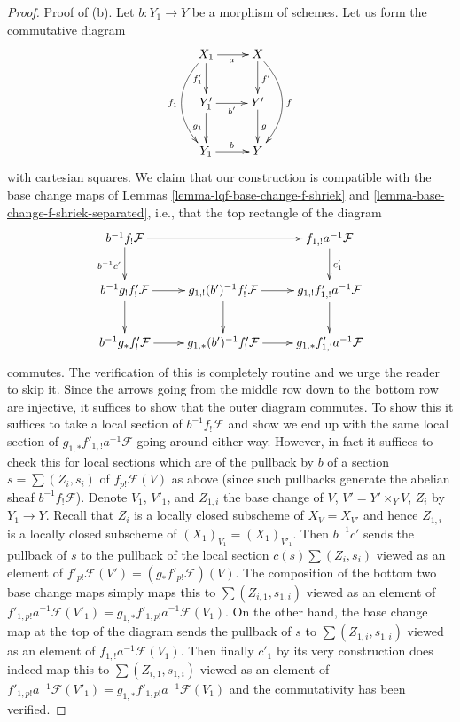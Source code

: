 \documentclass{stacks-project}
\theoremstyle{plain}
\theoremstyle{definition}
\theoremstyle{remark}
\numberwithin{equation}{subsection}
\begin{document}
\begin{proof}
\medskip\noindent
Proof of (b). Let $b : Y_1 \to Y$ be a morphism of schemes. Let us form the
commutative diagram
$$
\xymatrix{
X_1 \ar[d]_{f'_1} \ar[r]_a \ar@/_2em/[dd]_{f_1} &
X \ar[d]^{f'} \ar@/^2em/[dd]^f \\
Y'_1 \ar[d]_{g_1} \ar[r]_{b'} &
Y' \ar[d]^g \\
Y_1 \ar[r]^b &
Y
}
$$
with cartesian squares. We claim that our construction is compatible
with the base change maps of Lemmas \ref{lemma-lqf-base-change-f-shriek}
and \ref{lemma-base-change-f-shriek-separated}, i.e.,
that the top rectangle of the diagram
$$
\xymatrix{
b^{-1}f_!\mathcal{F} \ar[rr] \ar[d]_{b^{-1}c'} & &
f_{1, !}a^{-1}\mathcal{F} \ar[d]^{c_1'} \\
b^{-1}g_!f'_!\mathcal{F} \ar[r] \ar[d] &
g_{1, !}(b')^{-1}f'_!\mathcal{F} \ar[r] \ar[d] &
g_{1, !}f'_{1, !}a^{-1}\mathcal{F} \ar[d] \\
b^{-1}g_*f'_!\mathcal{F} \ar[r] &
g_{1, *}(b')^{-1}f'_!\mathcal{F} \ar[r] &
g_{1, *}f'_{1, !}a^{-1}\mathcal{F}
}
$$
commutes. The verification of this is completely routine and we
urge the reader to skip it. Since the arrows going from the middle
row down to the bottom row are injective, it suffices to show that
the outer diagram commutes.
To show this it suffices to take a local section of
$b^{-1}f_!\mathcal{F}$ and show we end up with the same local
section of $g_{1, *}f'_{1, !}a^{-1}\mathcal{F}$
going around either way. However, in fact it suffices to check
this for local sections which are of the pullback by $b$ of
a section $s = \sum (Z_i, s_i)$ of $f_{p!}\mathcal{F}(V)$
as above (since such pullbacks generate the abelian sheaf
$b^{-1}f_!\mathcal{F}$). Denote $V_1$, $V'_1$, and $Z_{1, i}$
the base change of $V$, $V' = Y' \times_Y V$, $Z_i$ by $Y_1 \to Y$.
Recall that $Z_i$ is a locally closed subscheme of $X_V = X_{V'}$
and hence $Z_{1, i}$ is a locally closed subscheme
of $(X_1)_{V_1} = (X_1)_{V'_1}$. Then $b^{-1}c'$ sends the pullback
of $s$ to the pullback of the local section $c(s) \sum (Z_i, s_i)$ viewed
as an element of $f'_{p!}\mathcal{F}(V') = (g_*f'_{p!}\mathcal{F})(V)$.
The composition of the bottom two base change maps
simply maps this to $\sum (Z_{i, 1}, s_{1, i})$ viewed as an
element of $f'_{1, p!}a^{-1}\mathcal{F}(V'_1) =
g_{1, *}f'_{1, p!}a^{-1}\mathcal{F}(V_1)$.
On the other hand, the base change map at the top of the diagram
sends the pullback of $s$ to $\sum (Z_{1, i}, s_{1, i})$ viewed
as an element of $f_{1, !}a^{-1}\mathcal{F}(V_1)$.
Then finally $c'_1$ by its very construction does indeed
map this to $\sum (Z_{i, 1}, s_{1, i})$ viewed as an
element of $f'_{1, p!}a^{-1}\mathcal{F}(V'_1) =
g_{1, *}f'_{1, p!}a^{-1}\mathcal{F}(V_1)$ and the commutativity
has been verified.


\end{proof}
\end{document}
